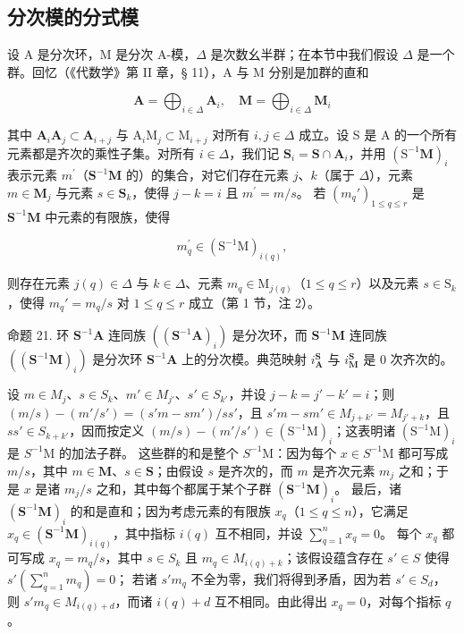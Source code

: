 \subsection{分次模的分式模}

设 A 是分次环，M 是分次 A-模，\(\Delta\) 是次数幺半群；在本节中我们假设 \(\Delta\) 是一个群。回忆（《代数学》第 II 章，§ 11），A 与 M 分别是加群的直和

\[
\mathbf {A} = \bigoplus_ {i \in \Delta} \mathbf {A} _ {i}, \quad \mathbf {M} = \bigoplus_ {i \in \Delta} \mathbf {M} _ {i}
\]

其中 \(\mathbf{A}_i\mathbf{A}_j\subset \mathbf{A}_{i + j}\) 与 \(\mathrm{A}_i\mathrm{M}_j\subset \mathrm{M}_{i + j}\) 对所有 \(i,j\in \Delta\) 成立。设 S 是 A 的一个所有元素都是齐次的乘性子集。对所有 \(i\in \Delta\)，我们记 \(\mathbf{S}_i = \mathbf{S}\cap \mathbf{A}_i\)，并用 \((\mathrm{S}^{-1}\mathbf{M})_i\) 表示元素 \(m^{\prime}\)（\(\mathbf{S}^{-1}\mathbf{M}\) 的）的集合，对它们存在元素 \(j\)、\(k\)（属于 \(\Delta\)），元素 \(m\in \mathbf{M}_j\) 与元素 \(s\in \mathbf{S}_k\)，使得 \(j - k = i\) 且 \(m^{\prime} = m / s\)。 若 \((m_q')_{1\leqslant q\leqslant r}\) 是 \(\mathbf{S}^{-1}\mathbf{M}\) 中元素的有限族，使得

\[
m _ {q} ^ {\prime} \in (\mathrm{S} ^ {- 1} \mathrm{M}) _ {i (q)},
\]

则存在元素 \(j(q) \in \Delta\) 与 \(k \in \Delta\)、元素 \(m_q \in \mathrm{M}_{j(q)}\)（\(1 \leqslant q \leqslant r\)）以及元素 \(s \in \mathrm{S}_k\)，使得 \(m_q' = m_q / s\) 对 \(1 \leqslant q \leqslant r\) 成立（第 1 节，注 2）。

命题 21. 环 \(\mathbf{S}^{-1}\mathbf{A}\) 连同族 \(((\mathbf{S}^{-1}\mathbf{A})_i)\) 是分次环，而 \(\mathbf{S}^{-1}\mathbf{M}\) 连同族 \(((\mathbf{S}^{-1}\mathbf{M})_i)\) 是分次环 \(\mathbf{S}^{-1}\mathbf{A}\) 上的分次模。典范映射 \(i_{\mathbf{A}}^{\mathbf{S}}\) 与 \(i_{\mathbf{M}}^{\mathbf{S}}\) 是 0 次齐次的。

设 \(m \in M_j\)、\(s \in S_k\)、\(m' \in M_{j'}\)、\(s' \in S_{k'}\)，并设 \(j - k = j' - k' = i\)；则 \((m/s) - (m'/s') = (s'm - sm')/ss'\)，且 \(s'm - sm' \in M_{j+k'} = M_{j'+k}\)，且 \(ss' \in S_{k+k'}\)，因而按定义 \((m/s) - (m'/s') \in (\mathrm{S}^{-1}\mathrm{M})_i\)；这表明诸 \((\mathrm{S}^{-1}\mathrm{M})_i\) 是 \(S^{-1}\mathrm{M}\) 的加法子群。 这些群的和是整个 \(S^{-1}\mathrm{M}\)：因为每个 \(x \in S^{-1}\mathrm{M}\) 都可写成 \(m/s\)，其中 \(m \in \mathbf{M}\)、\(s \in \mathbf{S}\)；由假设 \(s\) 是齐次的，而 \(m\) 是齐次元素 \(m_j\) 之和；于是 \(x\) 是诸 \(m_j / s\) 之和，其中每个都属于某个子群 \((\mathbf{S}^{-1}\mathbf{M})_i\)。 最后，诸 \((\mathbf{S}^{-1}\mathbf{M})_i\) 的和是直和；因为考虑元素的有限族 \(x_q\)（\(1 \leqslant q \leqslant n\)），它满足 \(x_q \in (\mathbf{S}^{-1}\mathbf{M})_{i(q)}\)，其中指标 \(i(q)\) 互不相同，并设 \(\sum_{q=1}^{n} x_q = 0\)。 每个 \(x_q\) 都可写成 \(x_q = m_q / s\)，其中 \(s \in S_k\) 且 \(m_q \in M_{i(q)+k}\)；该假设蕴含存在 \(s' \in S\) 使得 \(s'\left(\sum_{q=1}^{n} m_q\right) = 0\)； 若诸 \(s'm_q\) 不全为零，我们将得到矛盾，因为若 \(s' \in S_d\)，则 \(s'm_q \in M_{i(q)+d}\)，而诸 \(i(q) + d\) 互不相同。由此得出 \(x_q = 0\)，对每个指标 \(q\)。

